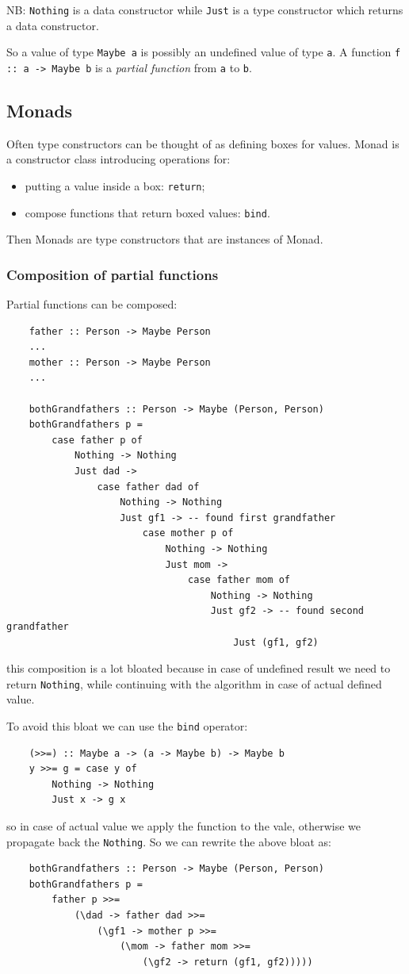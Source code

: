 NB: \verb|Nothing| is a data constructor while \verb|Just| is a type constructor which returns a data constructor.

So a value of type \verb|Maybe a| is possibly an undefined value of type \verb|a|.
A function \verb|f :: a -> Maybe b| is a \emph{partial function} from \verb|a| to \verb|b|.

\subsection{Monads}
Often type constructors can be thought of as defining boxes for values.
Monad is a constructor class introducing operations for:
\begin{itemize}
    \item putting a value inside a box: \verb|return|;
    \item compose functions that return boxed values: \verb|bind|.
\end{itemize}
Then Monads are type constructors that are instances of Monad.

\subsubsection{Composition of partial functions}
Partial functions can be composed:
\begin{verbatim}
    father :: Person -> Maybe Person
    ...
    mother :: Person -> Maybe Person
    ...

    bothGrandfathers :: Person -> Maybe (Person, Person)
    bothGrandfathers p =
        case father p of
            Nothing -> Nothing
            Just dad ->
                case father dad of
                    Nothing -> Nothing
                    Just gf1 -> -- found first grandfather
                        case mother p of
                            Nothing -> Nothing
                            Just mom ->
                                case father mom of
                                    Nothing -> Nothing
                                    Just gf2 -> -- found second grandfather
                                        Just (gf1, gf2)
\end{verbatim}
this composition is a lot bloated because in case of undefined result we need to return \verb|Nothing|, while continuing with the algorithm in case of actual defined value.

To avoid this bloat we can use the \verb|bind| operator:
\begin{verbatim}
    (>>=) :: Maybe a -> (a -> Maybe b) -> Maybe b
    y >>= g = case y of
        Nothing -> Nothing
        Just x -> g x
\end{verbatim}
so in case of actual value we apply the function to the vale, otherwise we propagate back the \verb|Nothing|.
So we can rewrite the above bloat as:
\begin{verbatim}
    bothGrandfathers :: Person -> Maybe (Person, Person)
    bothGrandfathers p =
        father p >>=
            (\dad -> father dad >>=
                (\gf1 -> mother p >>=
                    (\mom -> father mom >>=
                        (\gf2 -> return (gf1, gf2)))))
\end{verbatim}

